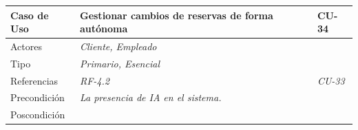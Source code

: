 \begin{table}[H]
    \begin{tabular}{|llllllll|}
    \hline
    \multicolumn{1}{|l|}{Caso de Uso}                   & \multicolumn{5}{l|}{Gestionar cambios de reservas de forma autónoma}                                                                                                                     & \multicolumn{2}{l|}{\cellcolor[HTML]{E6E6E6}CU-34}                                 \\ \hline
    \multicolumn{1}{|l|}{Actores}                       & \multicolumn{7}{l|}{{\color[HTML]{808080} \textit{Cliente, Empleado}}}                                                                                                                                                                                                        \\ \hline
    \multicolumn{1}{|l|}{Tipo}                          & \multicolumn{7}{l|}{{\color[HTML]{808080} \textit{Primario, Esencial}}}                                                                                                                                                                                                       \\ \hline
    \multicolumn{1}{|l|}{Referencias}                   & \multicolumn{2}{l|}{{\color[HTML]{808080} \textit{RF-4.2}}}                                     & \multicolumn{5}{l|}{{\color[HTML]{808080} \textit{CU-33}}}                                                                                                                  \\ \hline
    \multicolumn{1}{|l|}{Precondición}                  & \multicolumn{7}{l|}{{\color[HTML]{808080} \textit{La presencia de IA en el sistema.}}}                                                                                                                                                                                        \\ \hline
    \multicolumn{1}{|l|}{Poscondición}                  & \multicolumn{7}{l|}{}                                                                                                                                                                                                                                                         \\ \hline

\end{tabular}
\end{table}

